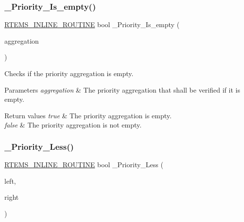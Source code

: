 \subsubsection{\texorpdfstring{\_Priority\_Is\_empty()}{\_Priority\_Is\_empty()}}
{\footnotesize\ttfamily \mbox{\hyperlink{group__RTEMSScoreBaseDefs_gac216239df231d5dbd15e3520b0b9313f}{R\+T\+E\+M\+S\+\_\+\+I\+N\+L\+I\+N\+E\+\_\+\+R\+O\+U\+T\+I\+NE}} bool \+\_\+\+Priority\+\_\+\+Is\+\_\+empty (\begin{DoxyParamCaption}\item[{const \mbox{\hyperlink{structPriority__Aggregation}{Priority\+\_\+\+Aggregation}} $\ast$}]{aggregation }\end{DoxyParamCaption})}



Checks if the priority aggregation is empty. 


\begin{DoxyParams}{Parameters}
{\em aggregation} & The priority aggregation that shall be verified if it is empty.\\
\hline
\end{DoxyParams}

\begin{DoxyRetVals}{Return values}
{\em true} & The priority aggregation is empty. \\
\hline
{\em false} & The priority aggregation is not empty. \\
\hline
\end{DoxyRetVals}
\mbox{\label{group__RTEMSScorePriority_ga7b22bc7ca1475fd603d1929d34776453}} 
\subsubsection{\texorpdfstring{\_Priority\_Less()}{\_Priority\_Less()}}
{\footnotesize\ttfamily \mbox{\hyperlink{group__RTEMSScoreBaseDefs_gac216239df231d5dbd15e3520b0b9313f}{R\+T\+E\+M\+S\+\_\+\+I\+N\+L\+I\+N\+E\+\_\+\+R\+O\+U\+T\+I\+NE}} bool \+\_\+\+Priority\+\_\+\+Less (\begin{DoxyParamCaption}\item[{const void $\ast$}]{left,  }\item[{const \mbox{\hyperlink{structRBTree__Node}{R\+B\+Tree\+\_\+\+Node}} $\ast$}]{right }\end{DoxyParamCaption})}



